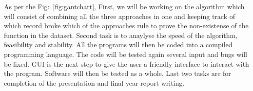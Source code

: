 As per the Fig:~\ref{fig:gantchart}, First, we will be working on the algorithm which will consist of combining all the three approaches in one and keeping track of which record broke which of the approaches rule to prove the non-existense of the function in the dataset. Second task is to anaylyse the speed of the algorithm, feasibility and stability. All the programs will then be coded into a compiled programming language. The code will be tested again several input and bugs will be fixed. GUI is the next step to give the user a friendly interface to interact with the program. Software will then be tested as a whole. Last two tasks are for completion of the presentation and final year report writing.